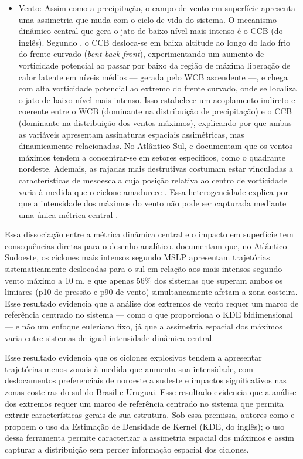\begin{itemize}
    \item Vento: Assim como a precipitação, o campo de vento em superfície apresenta uma assimetria que muda com o ciclo de vida do sistema. O mecanismo dinâmico central que gera o jato de baixo nível mais intenso é o CCB (do inglês). Segundo \citet{schemm2014linkage}, o CCB desloca-se em baixa altitude ao longo do lado frio do frente curvado (\textit{bent-back front}), experimentando um aumento de vorticidade potencial ao passar por baixo da região de máxima liberação de calor latente em níveis médios — gerada pelo WCB ascendente —, e chega com alta vorticidade potencial ao extremo do frente curvado, onde se localiza o jato de baixo nível mais intenso. Isso estabelece um acoplamento indireto e coerente entre o WCB (dominante na distribuição de precipitação) e o CCB (dominante na distribuição dos ventos máximos), explicando por que ambas as variáveis apresentam assinaturas espaciais assimétricas, mas dinamicamente relacionadas. No Atlântico Sul, \citet{bitencourt2010relating} e \citet{cardoso2022synoptic} documentam que os ventos máximos tendem a concentrar-se em setores específicos, como o quadrante nordeste. Ademais, as rajadas mais destrutivas costumam estar vinculadas a características de mesoescala cuja posição relativa ao centro de vorticidade varia à medida que o ciclone amadurece \citep{eisenstein2023identification}. Essa heterogeneidade explica por que a intensidade dos máximos do vento não pode ser capturada mediante uma única métrica central \citep{corner2025classification}.

\end{itemize}

Essa dissociação entre a métrica dinâmica central e o impacto em superfície tem consequências diretas para o desenho analítico. \citet{andrade2024composite} documentam que, no Atlântico Sudoeste, os ciclones mais intensos segundo MSLP apresentam trajetórias sistematicamente deslocadas para o sul em relação aos mais intensos segundo vento máximo a 10 m, e que apenas 56\% dos sistemas que superam ambos os limiares (p10 de pressão e p90 de vento) simultaneamente afetam a zona costeira. Esse resultado evidencia que a análise dos extremos de vento requer um marco de referência centrado no sistema — como o que proporciona o KDE bidimensional — e não um enfoque euleriano fixo, já que a assimetria espacial dos máximos varia entre sistemas de igual intensidade dinâmica central.

Esse resultado evidencia que os ciclones explosivos tendem a apresentar trajetórias menos zonais à medida que aumenta sua intensidade, com deslocamentos preferenciais de noroeste a sudeste e impactos significativos nas zonas costeiras do sul do Brasil e Uruguai. Esse resultado evidencia que a análise dos extremos requer um marco de referência centrado no sistema que permita extrair características gerais de sua estrutura. Sob essa premissa, autores como \citet{priestley2022improved} e \citet{han2025system} propoem o uso da Estimação de Densidade de Kernel (KDE, do inglês); o uso dessa ferramenta permite caracterizar a assimetria espacial dos máximos e assim capturar a distribuição sem perder informação espacial dos ciclones.

